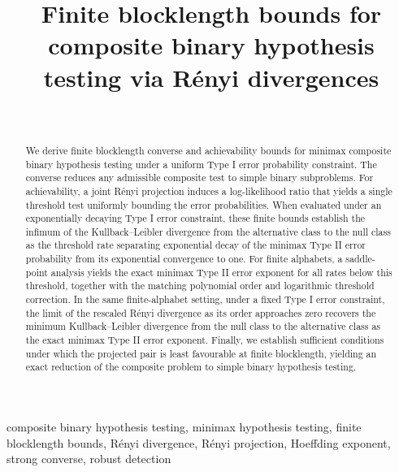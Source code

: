 \documentclass[journal,12pt,draftclsnofoot,onecolumn]{IEEEtran}
\begin{document}
\title{Finite blocklength bounds for composite binary hypothesis testing via R\'enyi divergences}
\author{\\
}

\maketitle


\begin{abstract}
We derive finite blocklength converse and achievability bounds for minimax composite binary hypothesis testing under a uniform Type I error probability constraint. The converse reduces any admissible composite test to simple binary subproblems. For achievability, a joint R\'enyi projection induces a log-likelihood ratio that yields a single threshold test uniformly bounding the error probabilities. When evaluated under an exponentially decaying Type I error constraint, these finite bounds establish the infimum of the Kullback--Leibler divergence from the alternative class to the null class as the threshold rate separating exponential decay of the minimax Type II error probability from its exponential convergence to one. For finite alphabets, a saddle-point analysis yields the exact minimax Type II error exponent for all rates below this threshold, together with the matching polynomial order and logarithmic threshold correction. In the same finite-alphabet setting, under a fixed Type I error constraint, the limit of the rescaled R\'enyi divergence as its order approaches zero recovers the minimum Kullback--Leibler divergence from the null class to the alternative class as the exact minimax Type II error exponent. Finally, we establish sufficient conditions under which the projected pair is least favourable at finite blocklength, yielding an exact reduction of the composite problem to simple binary hypothesis testing.
\end{abstract}
\begin{IEEEkeywords}
composite binary hypothesis testing, minimax hypothesis testing, finite blocklength bounds, R\'enyi divergence, R\'enyi projection, Hoeffding exponent, strong converse, robust detection
\end{IEEEkeywords}
\end{document}
